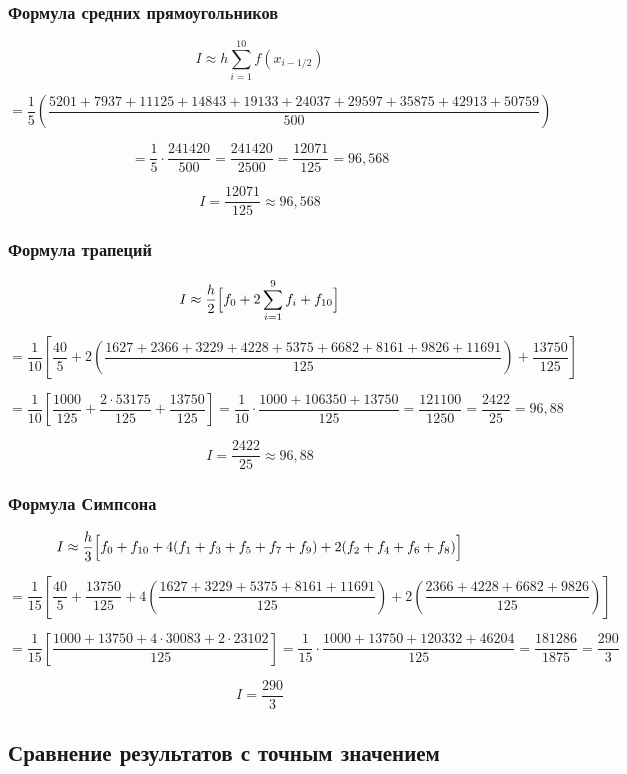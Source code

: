 \subsubsection{Формула средних прямоугольников}

\[
I \approx h\sum_{i=1}^{10} f(x_{i-1/2}) 
\]

\[
= \frac{1}{5}\left(\frac{5201+7937+11125+14843+19133+24037+29597+35875+42913+50759}{500}\right) 
\]

\[
= \frac{1}{5}\cdot\frac{241420}{500} = \frac{241420}{2500} = \frac{12071}{125} = 96{,}568
\]

\[
\boxed{I = \frac{12071}{125} \approx 96{,}568}
\]

\subsubsection{Формула трапеций}

\[
I \approx \frac{h}{2}\Bigl[f_0 + 2\sum_{i=1}^{9} f_i + f_{10}\Bigr] 
\]

\[
= \frac{1}{10}\left[\frac{40}{5} + 2\left(\frac{1627+2366+3229+4228+5375+6682+8161+9826+11691}{125}\right) + \frac{13750}{125}\right]
\]

\[
= \frac{1}{10}\left[\frac{1000}{125} + \frac{2\cdot 53175}{125} + \frac{13750}{125}\right] = \frac{1}{10}\cdot\frac{1000+106350+13750}{125} = \frac{121100}{1250} = \frac{2422}{25} = 96{,}88
\]

\[
\boxed{I = \frac{2422}{25} \approx 96{,}88}
\]

\subsubsection{Формула Симпсона}

\[
I \approx \frac{h}{3}\Bigl[f_0 + f_{10} + 4(f_1 + f_3 + f_5 + f_7 + f_9) + 2(f_2 + f_4 + f_6 + f_8)\Bigr]
\]

\[
= \frac{1}{15}\left[\frac{40}{5}+\frac{13750}{125}+4\left(\frac{1627+3229+5375+8161+11691}{125}\right)+2\left(\frac{2366+4228+6682+9826}{125}\right)\right]
\]

\[
= \frac{1}{15}\left[\frac{1000+13750+4\cdot 30083+2\cdot 23102}{125}\right] = \frac{1}{15}\cdot\frac{1000+13750+120332+46204}{125} = \frac{181286}{1875} = \frac{290}{3}
\]

\[
\boxed{I = \frac{290}{3}}
\]

\subsection{Сравнение результатов с точным значением}

